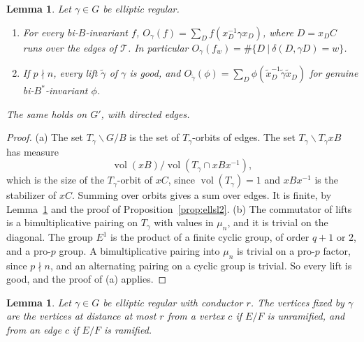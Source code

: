 \documentclass[12pt,letterpaper]{amsart}
\numberwithin{equation}{section}
\newtheorem{lemma}[theorem]{Lemma}
\theoremstyle{definition}
\theoremstyle{remark}
\DeclareMathOperator{\vol}{vol}
\begin{document}
\begin{lemma}
\label{lemma:ellcount}
Let $\gamma\in G$ be elliptic regular.
\begin{enumerate}[leftmargin=2em,label=(\alph*)]
\item For every bi-$B$-invariant $f$,
$O_\gamma(f)=\sum_Df(x_D^{-1}\gamma x_D)$, where $D=x_DC$ runs over the
edges of $\mathcal T$. In particular
$O_\gamma(f_w)=\#\{D\ |\ \delta(D,\gamma D)=w\}$.
\item If $p\nmid n$, every lift $\tilde\gamma$ of $\gamma$ is good, and
$O_{\tilde\gamma}(\phi)=\sum_D\phi(\tilde x_D^{-1}\tilde\gamma\tilde
x_D)$ for genuine bi-$B^*$-invariant $\phi$.
\end{enumerate}
The same holds on $G'$, with directed edges.
\end{lemma}

\begin{proof}
(a) The set $T_\gamma\backslash G/B$ is the set of $T_\gamma$-orbits
of edges. The set $T_\gamma\backslash T_\gamma xB$ has measure
\[
\vol(xB)/\vol(T_\gamma\cap xBx^{-1}),
\]
which is the size of the $T_\gamma$-orbit of $xC$, since $\vol(T_\gamma)=1$ and $xBx^{-1}$ is the
stabilizer of $xC$. Summing over orbits gives a sum over edges. It is
finite, by Lemma~\ref{lemma:fixedtree} and the proof of
Proposition~\ref{prop:ellsl2}. (b) The commutator of lifts is a
bimultiplicative pairing on $T_\gamma$ with values in $\mu_n$, and it is
trivial on the diagonal. The group $E^1$ is the product of a finite
cyclic group, of order $q+1$ or $2$, and a pro-$p$ group. A
bimultiplicative pairing into $\mu_n$ is trivial on a pro-$p$ factor,
since $p\nmid n$, and an alternating pairing on a cyclic group is
trivial. So every lift is good, and the proof of (a) applies.
\end{proof}

\begin{lemma}
\label{lemma:fixedtree}
Let $\gamma\in G$ be elliptic regular with conductor $r$. The vertices
fixed by $\gamma$ are the vertices at distance at most $r$ from a
vertex $c$ if $E/F$ is unramified, and from an edge $c$ if $E/F$ is
ramified.
\end{lemma}
\end{document}
